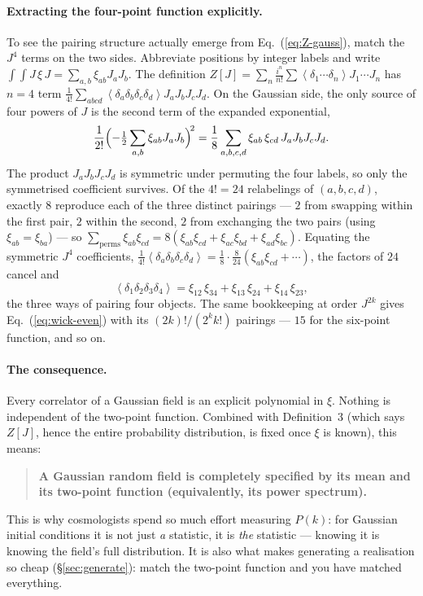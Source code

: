 \documentclass[12pt]{article}
\newcommand{\avg}[1]{\left\langle #1 \right\rangle}
\begin{document}
\paragraph{Extracting the four-point function explicitly.}  To see the
pairing structure actually emerge from Eq.~(\ref{eq:Z-gauss}), match the
$J^4$ terms on the two sides.  Abbreviate positions by integer labels and
write $\int\!\!\int J\,\xi\,J = \sum_{a,b}\xi_{ab}J_aJ_b$.  The definition
$Z[J] = \sum_n \frac{i^n}{n!}\sum \avg{\delta_1\cdots\delta_n}
J_1\cdots J_n$ has $n=4$ term
$\frac{1}{4!}\sum_{abcd}\avg{\delta_a\delta_b\delta_c\delta_d}
J_aJ_bJ_cJ_d$.  On the Gaussian side, the only source of four powers of
$J$ is the second term of the expanded exponential,
\begin{equation}
  \frac{1}{2!}\Bigl(-\tfrac12\sum_{a,b}\xi_{ab}J_aJ_b\Bigr)^{\!2}
  = \frac{1}{8}\sum_{a,b,c,d}\xi_{ab}\,\xi_{cd}\,J_aJ_bJ_cJ_d .
\end{equation}
The product $J_aJ_bJ_cJ_d$ is symmetric under permuting the four labels,
so only the symmetrised coefficient survives.  Of the $4! = 24$
relabelings of $(a,b,c,d)$, exactly $8$ reproduce each of the three
distinct pairings --- $2$ from swapping within the first pair, $2$ within
the second, $2$ from exchanging the two pairs (using
$\xi_{ab}=\xi_{ba}$) --- so
$\sum_{\text{perms}}\xi_{ab}\xi_{cd}
= 8(\xi_{ab}\xi_{cd}+\xi_{ac}\xi_{bd}+\xi_{ad}\xi_{bc})$.  Equating the
symmetric $J^4$ coefficients, $\frac{1}{4!}\avg{\delta_a\delta_b\delta_c
\delta_d} = \frac{1}{8}\cdot\frac{8}{24}
(\xi_{ab}\xi_{cd}+\cdots)$, the factors of $24$ cancel and
\begin{equation}
  \avg{\delta_1\delta_2\delta_3\delta_4}
  = \xi_{12}\,\xi_{34} + \xi_{13}\,\xi_{24} + \xi_{14}\,\xi_{23},
  \label{eq:wick4}
\end{equation}
the three ways of pairing four objects.  The same bookkeeping at order
$J^{2k}$ gives Eq.~(\ref{eq:wick-even}) with its
$(2k)!/(2^k k!)$ pairings --- $15$ for the six-point function, and so on.

\paragraph{The consequence.}  Every correlator of a Gaussian field is an
explicit polynomial in $\xi$.  Nothing is independent of the two-point
function.  Combined with Definition~3 (which says $Z[J]$, hence the
entire probability distribution, is fixed once $\xi$ is known), this
means:
\begin{quote}
\textbf{A Gaussian random field is completely specified by its mean and
its two-point function (equivalently, its power spectrum).}
\end{quote}
This is why cosmologists spend so much effort measuring $P(k)$: for
Gaussian initial conditions it is not just \emph{a} statistic, it is
\emph{the} statistic --- knowing it is knowing the field's full
distribution.  It is also what makes generating a realisation so cheap
(\S\ref{sec:generate}): match the two-point function and you
have matched everything.
\end{document}
